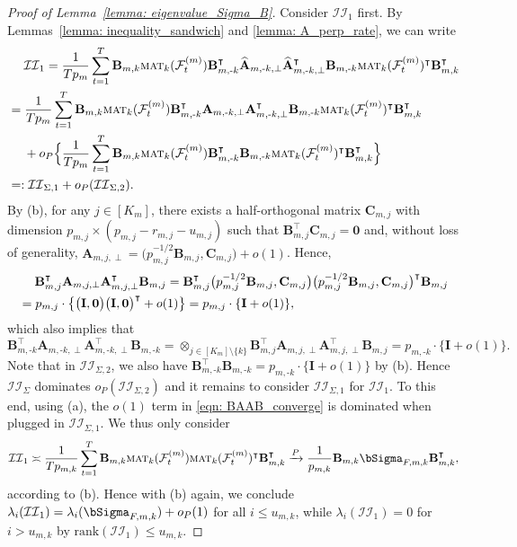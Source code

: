 \documentclass[aos]{imsart}
\theoremstyle{plain}
\theoremstyle{definition}
\def\mat{\textnormal{\textsc{mat}}}
\def\wh#1{\widehat{#1}}
\def\cF{\mathcal{F}}
\def\cII{\mathcal{II}}
\def\zero{\mathbf{0}}
\def\bI{\mathbf{I}}
\def\bA{\mathbf{A}}
\def\bB{\mathbf{B}}
\def\bC{\mathbf{C}}
\def\trans{\intercal}
\def\rank{\mathrm{rank}}
\begin{document}
\begin{proof}[Proof of Lemma~\ref{lemma: eigenvalue_Sigma_B}]
Consider $\cII_1$ first. By Lemmas~\ref{lemma: inequality_sandwich} and \ref{lemma: A_perp_rate}, we can write
\begin{align*}
    &\;\quad
    \cII_1 = \frac{1}{Tp_m} \sum_{t=1}^T \bB_{m,k} \mat_k(\cF_t^{(m)}) \bB_{m,\text{-}k}^\trans \wh{\bA}_{m,\text{-}k,\perp} \wh{\bA}_{m,\text{-}k,\perp}^\trans \bB_{m,\text{-}k} \mat_k(\cF_t^{(m)})^\trans \bB_{m,k}^\trans \\
    &=
    \frac{1}{Tp_m} \sum_{t=1}^T \bB_{m,k} \mat_k(\cF_t^{(m)}) \bB_{m,\text{-}k}^\trans \bA_{m,\text{-}k,\perp} \bA_{m,\text{-}k,\perp}^\trans \bB_{m,\text{-}k} \mat_k(\cF_t^{(m)})^\trans \bB_{m,k}^\trans \\
    &\;\quad
    + o_P\Big\{ \frac{1}{Tp_m} \sum_{t=1}^T \bB_{m,k} \mat_k(\cF_t^{(m)}) \bB_{m,\text{-}k}^\trans \bB_{m,\text{-}k} \mat_k(\cF_t^{(m)})^\trans \bB_{m,k}^\trans \Big\} \\
    &=: \cII_{\Sigma,1} + o_P(\cII_{\Sigma,2}) .
\end{align*}
By (b), for any $j\in[K_m]$, there exists a half-orthogonal matrix $\bC_{m,j}$ with dimension $p_{m,j}\times (p_{m,j} -r_{m,j} -u_{m,j})$ such that $\bB_{m,j}^\trans \bC_{m,j} =\zero$ and, without loss of generality, $\bA_{m,j,\perp} = \big( p_{m,j}^{-1/2} \bB_{m,j}, \bC_{m,j} \big) + o(1)$. Hence,
\begin{align}
    &\;\quad
    \bB_{m,j}^\trans \bA_{m,j,\perp} \bA_{m,j,\perp}^\trans \bB_{m,j} = \bB_{m,j}^\trans \big( p_{m,j}^{-1/2} \bB_{m,j}, \bC_{m,j} \big) \big( p_{m,j}^{-1/2} \bB_{m,j}, \bC_{m,j} \big)^\trans \bB_{m,j} \notag \\
    &=
    p_{m,j}\cdot \big\{ \big( \bI, \zero\big) \big( \bI, \zero\big)^\trans + o(1) \big\} = p_{m,j} \cdot \{\bI + o(1)\} ,
    \label{eqn: B_A_perp_A_perp_B}
\end{align}
which also implies that
\begin{equation}
\label{eqn: BAAB_converge}
\bB_{m,\text{-}k}^\trans \bA_{m,\text{-}k,\perp} \bA_{m,\text{-}k,\perp}^\trans \bB_{m,\text{-}k}
    = \otimes_{j\in[K_m] \setminus \{k\}} \bB_{m,j}^\trans \bA_{m,j,\perp} \bA_{m,j,\perp}^\trans \bB_{m,j}
    = p_{m,\text{-}k} \cdot \{ \bI+o(1)\} .
\end{equation}
Note that in $\cII_{\Sigma,2}$, we also have $\bB_{m,\text{-}k}^\trans \bB_{m,\text{-}k} = p_{m,\text{-}k} \cdot \{ \bI+o(1)\}$ by (b). Hence $\cII_{\Sigma}$ dominates $o_P(\cII_{\Sigma,2})$ and it remains to consider $\cII_{\Sigma,1}$ for $\cII_1$. To this end, using (a), the $o(1)$ term in \eqref{eqn: BAAB_converge} is dominated when plugged in $\cII_{\Sigma,1}$. We thus only consider
\[
\cII_1 \asymp \frac{1}{Tp_{m,k}} \sum_{t=1}^T \bB_{m,k} \mat_k(\cF_t^{(m)}) \mat_k(\cF_t^{(m)})^\trans \bB_{m,k}^\trans \xrightarrow{P} \frac{1}{p_{m,k}} \bB_{m,k} \bSigma_{F,m,k} \bB_{m,k}^\trans ,
\]
according to (b). Hence with (b) again, we conclude $\lambda_i(\cII_1) = \lambda_i(\bSigma_{F,m,k}) + o_P(1)$ for all $i\leq u_{m,k}$, while $\lambda_i(\cII_1) =0$ for $i> u_{m,k}$ by $\rank(\cII_1)\leq u_{m,k}$.



\end{proof}
\end{document}

